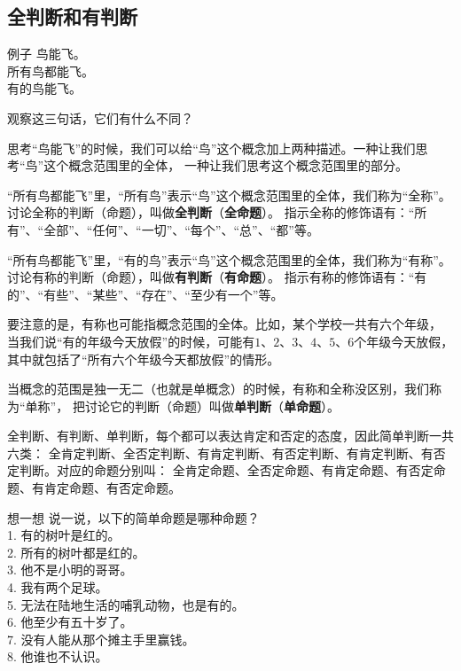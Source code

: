 \documentclass[12pt,UTF8,a4paper]{article}
\begin{document}
\subsection{全判断和有判断}

\begin{blockin}{例子}
    鸟能飞。\\
    所有鸟都能飞。\\
    有的鸟能飞。
\end{blockin}

观察这三句话，它们有什么不同？

思考“鸟能飞”的时候，我们可以给“鸟”这个概念加上两种描述。一种让我们思考“鸟”这个概念范围里的全体，
一种让我们思考这个概念范围里的部分。

“所有鸟都能飞”里，“所有鸟”表示“鸟”这个概念范围里的全体，我们称为“全称”。
讨论全称的判断（命题），叫做\textbf{全判断}（\textbf{全命题}）。
指示全称的修饰语有：“所有”、“全部”、“任何”、“一切”、“每个”、“总”、“都”等。

“所有鸟都能飞”里，“有的鸟”表示“鸟”这个概念范围里的全体，我们称为“有称”。
讨论有称的判断（命题），叫做\textbf{有判断}（\textbf{有命题}）。
指示有称的修饰语有：“有的”、“有些”、“某些”、“存在”、“至少有一个”等。

要注意的是，有称也可能指概念范围的全体。比如，某个学校一共有六个年级，
当我们说“有的年级今天放假”的时候，可能有$1$、$2$、$3$、$4$、$5$、$6$个年级今天放假，
其中就包括了“所有六个年级今天都放假”的情形。

当概念的范围是独一无二（也就是单概念）的时候，有称和全称没区别，我们称为“单称”，
把讨论它的判断（命题）叫做\textbf{单判断}（\textbf{单命题}）。

全判断、有判断、单判断，每个都可以表达肯定和否定的态度，因此简单判断一共六类：
全肯定判断、全否定判断、有肯定判断、有否定判断、有肯定判断、有否定判断。对应的命题分别叫：
全肯定命题、全否定命题、有肯定命题、有否定命题、有肯定命题、有否定命题。


\begin{blockaft}{想一想}
    说一说，以下的简单命题是哪种命题？\\
    1. 有的树叶是红的。 \\
    2. 所有的树叶都是红的。\\
    3. 他不是小明的哥哥。\\
    4. 我有两个足球。 \\
    5. 无法在陆地生活的哺乳动物，也是有的。\\
    6. 他至少有五十岁了。\\
    7. 没有人能从那个摊主手里赢钱。 \\
    8. 他谁也不认识。
\end{blockaft}
\end{document}
